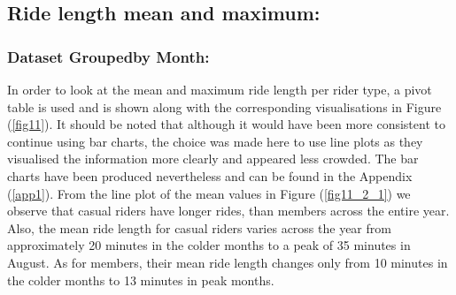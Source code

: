 \documentclass[12pt]{article}
\begin{document}
\subsection{Ride length mean and maximum:}\label{sec3}
\subsubsection*{Dataset Groupedby Month:}
In order to look at the mean and maximum ride length per rider type, a pivot table is used and is shown along with the corresponding visualisations in Figure (\underline{\ref{fig11}}). It should be noted that although it would have been more consistent to continue using bar charts, the choice was made here to use line plots as they visualised the information more clearly and appeared less crowded. The bar charts have been produced nevertheless and can be found in the Appendix (\underline{\ref{app1}}). From the line plot of the mean values in Figure (\underline{\ref{fig11_2_1}}) we observe that casual riders have longer rides, than members across the entire year. Also, the mean ride length for casual riders varies across the year from approximately 20 minutes in the colder months to a peak of 35 minutes in August. As for members, their mean ride length changes only from 10 minutes in the colder months to 13 minutes in peak months. \\
\end{document}
